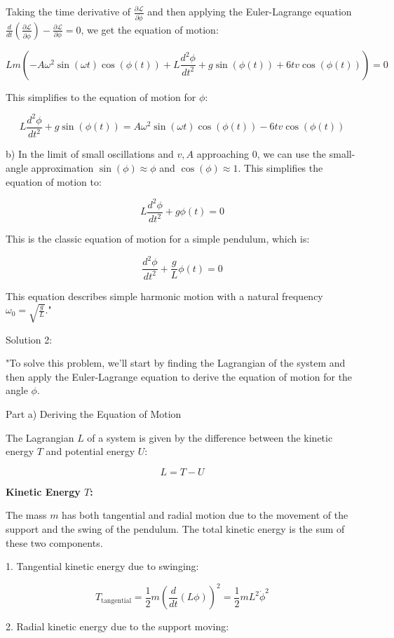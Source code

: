 Taking the time derivative of \( \frac{\partial \mathcal{L}}{\partial \dot{\phi}} \) and then applying the Euler-Lagrange equation \( \frac{d}{dt}\left(\frac{\partial \mathcal{L}}{\partial \dot{\phi}}\right) - \frac{\partial \mathcal{L}}{\partial \phi} = 0 \), we get the equation of motion:

\[ Lm\left(-A\omega^2\sin(\omega t)\cos(\phi(t)) + L\frac{d^2\phi}{dt^2} + g\sin(\phi(t)) + 6tv\cos(\phi(t))\right) = 0 \]

This simplifies to the equation of motion for \( \phi \):

\[ L\frac{d^2\phi}{dt^2} + g\sin(\phi(t)) = A\omega^2\sin(\omega t)\cos(\phi(t)) - 6tv\cos(\phi(t)) \]

b) In the limit of small oscillations and \( v, A \) approaching 0, we can use the small-angle approximation \( \sin(\phi) \approx \phi \) and \( \cos(\phi) \approx 1 \). This simplifies the equation of motion to:

\[ L\frac{d^2\phi}{dt^2} + g\phi(t) = 0 \]

This is the classic equation of motion for a simple pendulum, which is:

\[ \frac{d^2\phi}{dt^2} + \frac{g}{L}\phi(t) = 0 \]

This equation describes simple harmonic motion with a natural frequency \( \omega_0 = \sqrt{\frac{g}{L}} \)."

Solution 2:  

"To solve this problem, we'll start by finding the Lagrangian of the system and then apply the Euler-Lagrange equation to derive the equation of motion for the angle \( \phi \).

Part a) Deriving the Equation of Motion

The Lagrangian \( L \) of a system is given by the difference between the kinetic energy \( T \) and potential energy \( U \):

\[ L = T - U \]

\textbf{Kinetic Energy \( T \):}

The mass \( m \) has both tangential and radial motion due to the movement of the support and the swing of the pendulum. The total kinetic energy is the sum of these two components.

1. Tangential kinetic energy due to swinging:

\[ T_{\text{tangential}} = \frac{1}{2} m (\frac{d}{dt}(L \phi))^2 = \frac{1}{2} m L^2 \dot{\phi}^2 \]

2. Radial kinetic energy due to the support moving:

